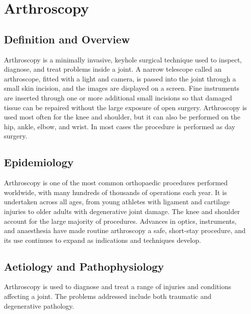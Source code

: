 \chapter{Arthroscopy}

\section*{Definition and Overview}
Arthroscopy is a minimally invasive, keyhole surgical technique used to inspect, diagnose, and treat problems inside a joint. A narrow telescope called an arthroscope, fitted with a light and camera, is passed into the joint through a small skin incision, and the images are displayed on a screen. Fine instruments are inserted through one or more additional small incisions so that damaged tissue can be repaired without the large exposure of open surgery. Arthroscopy is used most often for the knee and shoulder, but it can also be performed on the hip, ankle, elbow, and wrist. In most cases the procedure is performed as day surgery.

\section*{Epidemiology}
Arthroscopy is one of the most common orthopaedic procedures performed worldwide, with many hundreds of thousands of operations each year. It is undertaken across all ages, from young athletes with ligament and cartilage injuries to older adults with degenerative joint damage. The knee and shoulder account for the large majority of procedures. Advances in optics, instruments, and anaesthesia have made routine arthroscopy a safe, short-stay procedure, and its use continues to expand as indications and techniques develop.

\section*{Aetiology and Pathophysiology}
Arthroscopy is used to diagnose and treat a range of injuries and conditions affecting a joint. The problems addressed include both traumatic and degenerative pathology.

